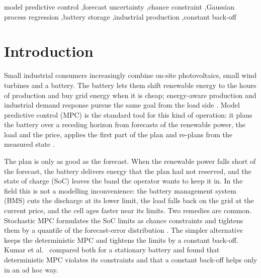 \documentclass[a4paper,fleqn]{cas-dc}
\begin{document}
\begin{keywords}
model predictive control \sep forecast uncertainty \sep chance constraint \sep Gaussian process regression \sep battery storage \sep industrial production \sep constant back-off
\end{keywords}

\maketitle

\section{Introduction}\label{sec:intro}

Small industrial consumers increasingly combine on-site photovoltaics, small wind turbines and a battery. The battery lets them shift renewable energy to the hours of production and buy grid energy when it is cheap; energy-aware production and industrial demand response pursue the same goal from the load side \cite{gahm2016energy,shoreh2016survey,zhang2016enterprise,golmohamadi2022demand,beier2017energy}. Model predictive control (MPC) is the standard tool for this kind of operation: it plans the battery over a receding horizon from forecasts of the renewable power, the load and the price, applies the first part of the plan and re-plans from the measured state \cite{mayne2000constrained,rawlings2017model,parisio2014mpc,hu2021mpcmicrogrid}.

The plan is only as good as the forecast. When the renewable power falls short of the forecast, the battery delivers energy that the plan had not reserved, and the state of charge (SoC) leaves the band the operator wants to keep it in. In the field this is not a modelling inconvenience: the battery management system (BMS) cuts the discharge at its lower limit, the load falls back on the grid at the current price, and the cell ages faster near its limits. Two remedies are common. Stochastic MPC formulates the SoC limits as chance constraints and tightens them by a quantile of the forecast-error distribution \cite{mesbah2016stochastic,farina2016stochastic,oldewurtel2012use}. The simpler alternative keeps the deterministic MPC and tightens the limits by a constant back-off. Kumar et al.\ \cite{kumar2019benchmarking} compared both for a stationary battery and found that deterministic MPC violates its constraints and that a constant back-off helps only in an ad hoc way.
\end{document}
